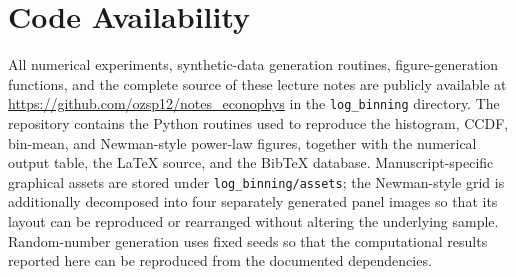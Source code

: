 \section*{Code Availability}

All numerical experiments, synthetic-data generation routines, figure-generation functions, and the complete source of these lecture notes are publicly available at \url{https://github.com/ozsp12/notes_econophys} in the \texttt{log\_binning} directory. The repository contains the Python routines used to reproduce the histogram, CCDF, bin-mean, and Newman-style power-law figures, together with the numerical output table, the LaTeX source, and the BibTeX database. Manuscript-specific graphical assets are stored under \texttt{log\_binning/assets}; the Newman-style grid is additionally decomposed into four separately generated panel images so that its layout can be reproduced or rearranged without altering the underlying sample. Random-number generation uses fixed seeds so that the computational results reported here can be reproduced from the documented dependencies.

